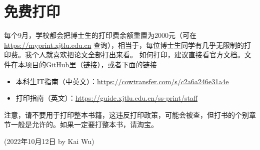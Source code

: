 \section{免费打印}
每个9月，学校都会把博士生的打印费余额重置为2000元（可在 \url{https://myprint.xjtlu.edu.cn} 查询），相当于，每位博士生同学有几乎无限制的打印费。我个人就喜欢把论文全部打出来看。
如何打印，建议直接看官方文档。文件在本项目的GitHub里（\href{https://github.com/kaiwu-astro/xp_pgrs_unofficial_guide/tree/main/fileshare}{链接}），或者下面的链接
\begin{itemize}
    \item 本科生IT指南（中英文）：\url{https://cowtransfer.com/s/c2a6a246e31a4e}
    \item 打印指南（英文）：\url{https://guide.xjtlu.edu.cn/ss-print/staff}
\end{itemize}

注意，请不要用于打印整本书籍，这违反打印政策，可能会被查，但打书的个别章节一般是允许的。如果一定要打整本书，请淘宝。


\begin{flushright}
(2022年10月12日 by Kai Wu)
\end{flushright}